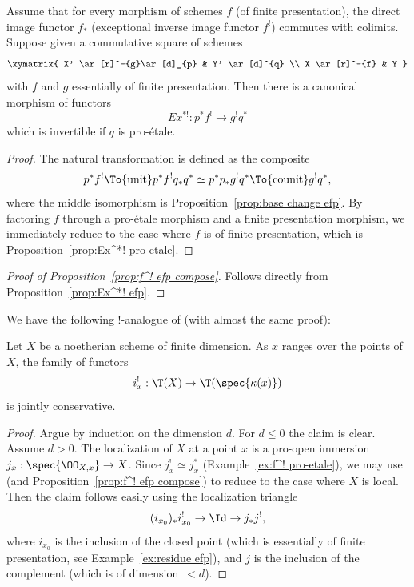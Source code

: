 \begin{prop}[$*!$-exchange]\label{prop:Ex^*! efp}
Assume that for every morphism of schemes $f$ (\resp of finite presentation), the direct image functor $f_*$ (\resp exceptional inverse image functor $f^!$) commutes with colimits.
Suppose given a commutative square of schemes
\[
\xymatrix{
X' \ar[r]^-{g}\ar[d]_{p}
& Y' \ar[d]^{q}
\\
X \ar[r]^-{f}
& Y
}
\]
with $f$ and $g$ essentially of finite presentation.
Then there is a canonical morphism of functors
\[
Ex^{*!} : p^*f^! \to g^!q^*
\]
which is invertible if $q$ is pro-étale.
\end{prop}
\begin{proof}
The natural transformation is defined as the composite
\[
p^*f^!
\To{\mathrm{unit}} p^*f^!q_*q^*
\simeq p^*p_*g^!q^*
\To{\mathrm{counit}}
g^!q^*,
\]
where the middle isomorphism is Proposition~\ref{prop:base change efp}.
By factoring $f$ through a pro-étale morphism and a finite presentation morphism, we immediately reduce to the case where $f$ is of finite presentation, which is Proposition~\ref{prop:Ex^*! pro-etale}.
\end{proof}

\begin{proof}[Proof of Proposition~\ref{prop:f^! efp compose}]
Follows directly from Proposition~\ref{prop:Ex^*! efp}.
\end{proof}

We have the following $!$-analogue of \cite[Cor.\,4.3.17]{CD3} (with almost the same proof):

\begin{prop}\label{prop:shriek conservative}
Let $X$ be a noetherian scheme of finite dimension.
As $x$ ranges over the points of $X$, the family of functors
\[
i_x^! : \T(X) \to \T(\spec{\kappa(x)})
\]
is jointly conservative.
\end{prop}
\begin{proof}
Argue by induction on the dimension $d$.
For $d\leqslant 0$ the claim is clear.
Assume $d>0$.
The localization of $X$ at a point $x$ is a pro-open immersion \hbox{$j_x : \spec{\OO_{X,x}} \to X$}.
Since $j_x^! \simeq j_x^*$ (Example~\ref{ex:f^! pro-etale}), we may use \cite[Prop.\,4.3.9]{CD3} (and Proposition~\ref{prop:f^! efp compose}) to reduce to the case where $X$ is local.
Then the claim follows easily using the localization triangle
\[
(i_{x_0})_*i_{x_0}^! \to \Id \to j_*j^!,
\]
where $i_{x_0}$ is the inclusion of the closed point (which is essentially of finite presentation, see Example~\ref{ex:residue efp}), and $j$ is the inclusion of the complement (which is of dimension~\hbox{$< d$}).
\end{proof}

